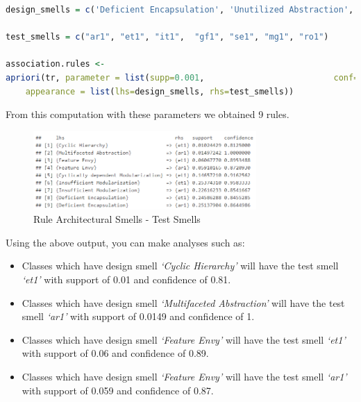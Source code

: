 \begin{lstlisting}[language=R]
design_smells = c('Deficient Encapsulation', 'Unutilized Abstraction', 'Feature Envy',  'Broken Hierarchy', 'Broken Modularization', 'Insufficient Modularization', 'Wide Hierarchy', 'Unnecessary Abstraction', 'Multifaceted Abstraction', 'Cyclically-dependent Modularization','Cyclic Hierarchy', 'Rebellious Hierarchy')

test_smells = c("ar1", "et1", "it1",  "gf1", "se1", "mg1", "ro1")

association.rules <- 
apriori(tr, parameter = list(supp=0.001,                          conf=0.8, minlen=2, maxlen=2),
    appearance = list(lhs=design_smells, rhs=test_smells))
\end{lstlisting}

From this computation with these parameters we obtained 9 rules.


\begin{figure}[htp]
    \centering
    \includegraphics[width=8.5cm]{img/ruleArchTest.PNG}
    \caption{Rule Architectural Smells - Test Smells}
    \label{fig:ruleArchTest}
\end{figure}

Using the above output, you can make analyses such as:
\begin{itemize}
  \item Classes which have design smell \textit{‘Cyclic Hierarchy’} will have the test smell \textit{‘et1’} with support of 0.01 and confidence of 0.81.
  \item Classes which have design smell \textit{‘Multifaceted Abstraction’} will have the test smell \textit{‘ar1’} with support of 0.0149 and confidence of 1.
  \item Classes which have design smell \textit{‘Feature Envy’} will have the test smell \textit{‘et1’} with support of 0.06 and confidence of 0.89.
  \item Classes which have design smell \textit{‘Feature Envy’} will have the test smell \textit{‘ar1’} with support of 0.059 and confidence of 0.87.
\end{itemize}

